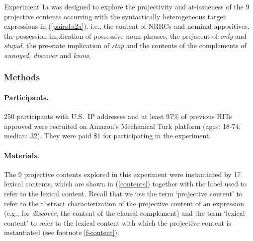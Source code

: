 \documentclass[11pt,fleqn]{article}
\newcommand{\6}{\mbox{$[\hspace*{-.6mm}[$}}
\newcommand{\9}{\mbox{$]\hspace*{-.6mm}]$}}
\begin{document}
Experiment 1a was designed to explore the projectivity and at-issueness of the 9 projective contents occurring with the syntactically heterogeneous target expressions in (\ref{pairs1a2a}), i.e., the content of NRRCs and nominal appositives, the possession implication of possessive noun phrases, the prejacent of {\em only} and {\em stupid}, the pre-state implication of {\em stop} and the contents of the complements of {\em annoyed, discover} and {\em know}.

\subsubsection{Methods}\label{s-methods-1a}

\paragraph{Participants.} 250 participants with U.S.\ IP addresses and at least 97\% of previous HITs approved were recruited on Amazon's Mechanical Turk platform (ages: 18-74; median: 32). They were paid \$1 for participating in the experiment. 

\paragraph{Materials.} The 9 projective contents explored in this experiment were instantiated by 17 lexical contents, which are shown in (\ref{contents}) together with the label used to refer to the lexical content. Recall that we use the term `projective content' to refer to the abstract characterization of the projective content of an expression (e.g., for {\em discover}, the content of the clausal complement) and the term `lexical content' to refer to the lexical content with which the projective content is instantiated (see footnote \ref{f-content}).
\end{document}
